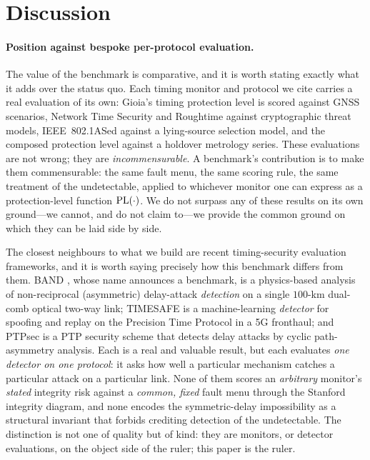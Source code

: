 \section{Discussion}
\label{sec:discussion}

\paragraph{Position against bespoke per-protocol evaluation.}
The value of the benchmark is comparative, and it is worth stating exactly what it
adds over the status quo. Each timing monitor and protocol we cite carries a real
evaluation of its own: Gioia's timing protection level \citep{gioia2023} is scored
against GNSS scenarios, Network Time Security \citep{rfc8915} and Roughtime
\citep{roughtime} against cryptographic threat models, IEEE~802.1ASed
\citep{ieee8021ased} against a lying-source selection model, and the composed
protection level \citep{baweja2026cti} against a holdover metrology series. These
evaluations are not wrong; they are \emph{incommensurable}. A benchmark's
contribution is to make them commensurable: the same fault menu, the same scoring
rule, the same treatment of the undetectable, applied to whichever monitor one can
express as a protection-level function $\mathrm{PL}(\cdot)$. We do not surpass any of these
results on its own ground---we cannot, and do not claim to---we provide the common
ground on which they can be laid side by side.

The closest neighbours to what we build are recent timing-security evaluation
frameworks, and it is worth saying precisely how this benchmark differs from them.
BAND \citep{ren2025band}, whose name announces a benchmark, is a physics-based
analysis of non-reciprocal (asymmetric) delay-attack \emph{detection} on a single
$100$-km dual-comb optical two-way link; TIMESAFE \citep{groen2024timesafe} is a
machine-learning \emph{detector} for spoofing and replay on the Precision Time
Protocol in a 5G fronthaul; and PTPsec \citep{finkenzeller2024ptpsec} is a PTP
security scheme that detects delay attacks by cyclic path-asymmetry analysis. Each
is a real and valuable result, but each evaluates \emph{one detector on one
protocol}: it asks how well a particular mechanism catches a particular attack on a
particular link. None of them scores an \emph{arbitrary} monitor's \emph{stated}
integrity risk against a \emph{common, fixed} fault menu through the Stanford
integrity diagram, and none encodes the symmetric-delay impossibility as a
structural invariant that forbids crediting detection of the undetectable. The
distinction is not one of quality but of kind: they are monitors, or detector
evaluations, on the object side of the ruler; this paper is the ruler.

